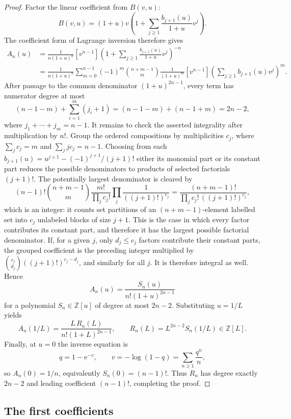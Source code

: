 \documentclass[11pt,a4paper]{article}
\numberwithin{equation}{section}
\theoremstyle{definition}
\theoremstyle{remark}
\newcommand{\e}{\mathrm e}
\begin{document}
\begin{proof}
Factor the linear coefficient from \(B(v,u)\):
\[
 B(v,u)=(1+u)v\left(1+
 \sum_{j\ge1}\frac{b_{j+1}(u)}{1+u}v^j\right).
\]
The coefficient form of Lagrange inversion therefore gives
\begin{align*}
 A_n(u)
 &=\frac{1}{n(1+u)^n}
 [v^{n-1}]
 \left(1+\sum_{j\ge1}
 \frac{b_{j+1}(u)}{1+u}v^j\right)^{-n}\\
 &=\frac1{n(1+u)^n}
 \sum_{m=0}^{n-1}(-1)^m
 \binom{n+m-1}{m}\frac{1}{(1+u)^m}
 [v^{n-1}]\left(\sum_{j\ge1}b_{j+1}(u)v^j\right)^m.
\end{align*}
After passage to the common denominator \((1+u)^{2n-1}\), every term
has numerator degree at most
\[
 (n-1-m)+\sum_{i=1}^{m}(j_i+1)
 =(n-1-m)+(n-1+m)=2n-2,
\]
where \(j_1+\cdots+j_m=n-1\).  It remains to check the asserted
integrality after multiplication by \(n!\).  Group the ordered
compositions by multiplicities \(c_j\), where
\(\sum_jc_j=m\) and \(\sum_jj c_j=n-1\).  Choosing from each
\(b_{j+1}(u)=u^{j+1}-(-1)^{j+1}/(j+1)!\) either its monomial part or its
constant part reduces the possible denominators to products of selected
factorials \((j+1)!\).  The potentially largest denominator is cleared by
\[
 (n-1)!\binom{n+m-1}{m}\frac{m!}{\prod_jc_j!}
 \prod_j\frac1{((j+1)!)^{c_j}}
 =\frac{(n+m-1)!}
 {\prod_jc_j!\,((j+1)!)^{c_j}},
\]
which is an integer: it counts set partitions of an
\((n+m-1)\)-element labelled set into \(c_j\) unlabeled blocks of size
\(j+1\).  This is the case in which every factor contributes its
constant part, and therefore it has the largest possible factorial
denominator.  If, for a given \(j\), only \(d_j\le c_j\) factors
contribute their constant parts, the grouped coefficient is the preceding
integer multiplied by
\(\binom{c_j}{d_j}((j+1)!)^{c_j-d_j}\), and similarly for all \(j\).
It is therefore integral as well.  Hence
\[
 A_n(u)=\frac{S_n(u)}{n!(1+u)^{2n-1}}
\]
for a polynomial \(S_n\in\mathbb Z[u]\) of degree at most \(2n-2\).
Substituting \(u=1/L\) yields
\[
 A_n(1/L)=\frac{L\,R_n(L)}{n!(1+L)^{2n-1}},
 \qquad R_n(L)=L^{2n-2}S_n(1/L)\in\mathbb Z[L].
\]
Finally, at \(u=0\) the inverse equation is
\[
 q=1-\e^{-v},
 \qquad v=-\log(1-q)=\sum_{n\ge1}\frac{q^n}{n},
\]
so \(A_n(0)=1/n\), equivalently \(S_n(0)=(n-1)!\).  Thus
\(R_n\) has degree exactly \(2n-2\) and leading coefficient
\((n-1)!\), completing the proof.
\end{proof}

\subsection{The first coefficients}
\end{document}
